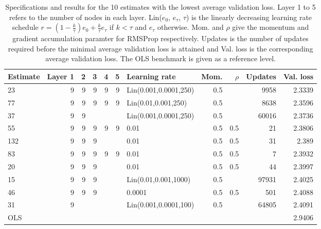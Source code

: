 \begin{table}
\centering
\caption{Specifications and results for the 10 estimates with the lowest average validation loss. Layer 1 to 5 refers to the number of nodes in each layer. Lin($e_0$, $e_\tau$, $\tau$) is the linearly decreasing learning rate schedule $r=(1-\frac{k}{\tau})e_0+\frac{k}{\tau}e_\tau$ if $k<\tau$ and $e_\tau$ otherwise. Mom. and $\rho$ give the momentum and gradient accumulation paramter for RMSProp respectively. Updates is the number of updates required before the minimal average validation loss is attained and Val. loss is the corresponding average validation loss. The OLS benchmark is given as a reference level.}
\label{tab:Best_results}
\begin{tabular}{lrrrrrlrrrr}
\toprule
Estimate & Layer 1 & 2 & 3 & 4 & 5 &         Learning rate & Mom. & $\rho$ & Updates & Val. loss \\
\midrule
      23 &       9 & 9 & 9 & 9 & 9 & Lin(0.001,0.0001,250) &  0.5 &        &    9958 &    2.3339 \\
      77 &       9 & 9 & 9 & 9 & 9 &   Lin(0.01,0.001,250) &  0.5 &        &    8638 &    2.3596 \\
      37 &       9 & 9 &   &   &   & Lin(0.001,0.0001,250) &  0.5 &        &   60016 &    2.3736 \\
      55 &       9 & 9 & 9 & 9 & 9 &                  0.01 &  0.5 &    0.5 &      21 &    2.3806 \\
     132 &       9 & 9 & 9 &   &   &                  0.01 &  0.5 &    0.5 &      31 &     2.389 \\
      83 &       9 & 9 & 9 & 9 & 9 &                  0.01 &  0.5 &    0.5 &       7 &    2.3932 \\
      20 &       9 & 9 & 9 &   &   &                  0.01 &  0.5 &    0.5 &      44 &    2.3997 \\
      15 &       9 & 9 & 9 &   &   &  Lin(0.01,0.001,1000) &  0.5 &        &   97931 &    2.4025 \\
      46 &       9 & 9 & 9 &   &   &                0.0001 &  0.5 &    0.5 &     501 &    2.4088 \\
      31 &       9 &   &   &   &   & Lin(0.001,0.0001,100) &  0.5 &        &   64805 &    2.4091 \\
     OLS &         &   &   &   &   &                       &      &        &         &    2.9406 \\
\bottomrule
\end{tabular}
\end{table}
